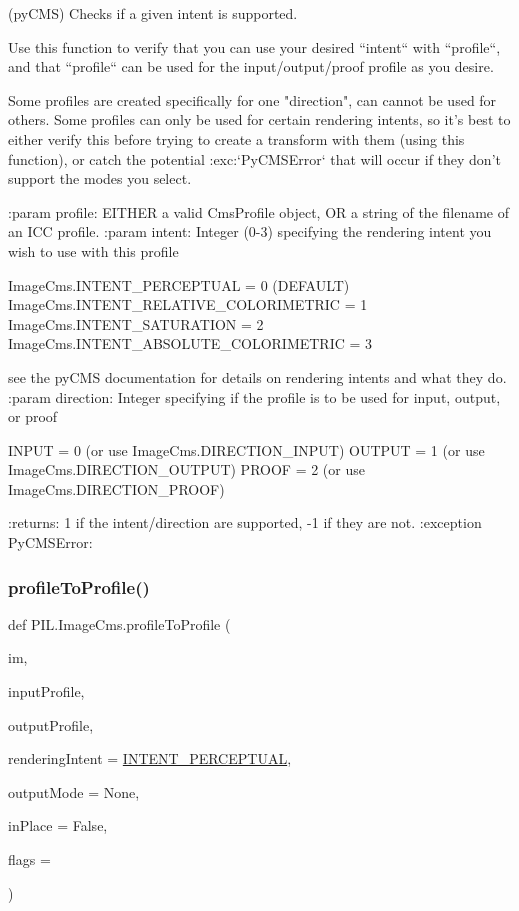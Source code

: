 \begin{DoxyVerb}(pyCMS) Checks if a given intent is supported.

Use this function to verify that you can use your desired
``intent`` with ``profile``, and that ``profile`` can be used for the
input/output/proof profile as you desire.

Some profiles are created specifically for one "direction", can cannot
be used for others. Some profiles can only be used for certain
rendering intents, so it's best to either verify this before trying
to create a transform with them (using this function), or catch the
potential :exc:`PyCMSError` that will occur if they don't
support the modes you select.

:param profile: EITHER a valid CmsProfile object, OR a string of the
    filename of an ICC profile.
:param intent: Integer (0-3) specifying the rendering intent you wish to
    use with this profile

        ImageCms.INTENT_PERCEPTUAL            = 0 (DEFAULT)
        ImageCms.INTENT_RELATIVE_COLORIMETRIC = 1
        ImageCms.INTENT_SATURATION            = 2
        ImageCms.INTENT_ABSOLUTE_COLORIMETRIC = 3

    see the pyCMS documentation for details on rendering intents and what
        they do.
:param direction: Integer specifying if the profile is to be used for
    input, output, or proof

        INPUT  = 0 (or use ImageCms.DIRECTION_INPUT)
        OUTPUT = 1 (or use ImageCms.DIRECTION_OUTPUT)
        PROOF  = 2 (or use ImageCms.DIRECTION_PROOF)

:returns: 1 if the intent/direction are supported, -1 if they are not.
:exception PyCMSError:
\end{DoxyVerb}
 \mbox{\label{namespacePIL_1_1ImageCms_ac22e72af9b4514293b262df91cd37fd3}} 
\subsubsection{\texorpdfstring{profile\+To\+Profile()}{profileToProfile()}}
{\footnotesize\ttfamily def P\+I\+L.\+Image\+Cms.\+profile\+To\+Profile (\begin{DoxyParamCaption}\item[{}]{im,  }\item[{}]{input\+Profile,  }\item[{}]{output\+Profile,  }\item[{}]{rendering\+Intent = {\ttfamily \hyperlink{namespacePIL_1_1ImageCms_a5ede11c95f67c7ea71b86e9a9e8a4f87}{I\+N\+T\+E\+N\+T\+\_\+\+P\+E\+R\+C\+E\+P\+T\+U\+AL}},  }\item[{}]{output\+Mode = {\ttfamily None},  }\item[{}]{in\+Place = {\ttfamily False},  }\item[{}]{flags = {} }\end{DoxyParamCaption})}


